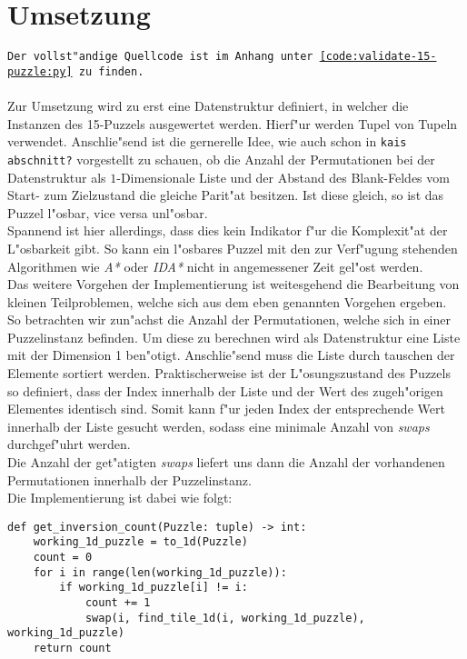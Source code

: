 \section{Umsetzung} %
\label{cha:Umsetzung}
\texttt{Der vollst"andige Quellcode ist im Anhang unter \ref{code:validate-15-puzzle:py} zu finden.}\\\\
Zur Umsetzung wird zu erst eine Datenstruktur definiert, in welcher die Instanzen des 15-Puzzels ausgewertet werden. Hierf"ur werden Tupel von Tupeln verwendet.
Anschlie"send ist die gernerelle Idee, wie auch schon in \texttt{kais abschnitt?} vorgestellt zu schauen, ob die Anzahl der Permutationen bei der Datenstruktur als $1$-Dimensionale Liste und der Abstand des Blank-Feldes vom Start- zum Zielzustand die gleiche Parit"at besitzen.
Ist diese gleich, so ist das Puzzel l"osbar, vice versa unl"osbar.\\
Spannend ist hier allerdings, dass dies kein Indikator f"ur die Komplexit"at der L"osbarkeit gibt. So kann ein l"osbares Puzzel mit den zur Verf"ugung stehenden Algorithmen wie \textit{A*} oder \textit{IDA*} nicht in angemessener Zeit gel"ost werden.\\
Das weitere Vorgehen der Implementierung ist weitesgehend die Bearbeitung von kleinen Teilproblemen, welche sich aus dem eben genannten Vorgehen ergeben.\\
So betrachten wir zun"achst die Anzahl der Permutationen, welche sich in einer Puzzelinstanz befinden. Um diese zu berechnen wird als Datenstruktur eine Liste mit der Dimension 1 ben"otigt.
Anschlie"send muss die Liste durch tauschen der Elemente sortiert werden.
Praktischerweise ist der L"osungszustand des Puzzels so definiert, dass der Index innerhalb der Liste und der Wert des zugeh"origen Elementes identisch sind. Somit kann f"ur jeden Index der entsprechende Wert innerhalb der Liste gesucht werden, sodass eine minimale Anzahl von \textit{swaps} durchgef"uhrt werden. \\Die Anzahl der get"atigten \textit{swaps} liefert uns dann die Anzahl der vorhandenen Permutationen innerhalb der Puzzelinstanz.\\
Die Implementierung ist dabei wie folgt:
\begin{verbatim}
def get_inversion_count(Puzzle: tuple) -> int:
    working_1d_puzzle = to_1d(Puzzle)
    count = 0
    for i in range(len(working_1d_puzzle)):
        if working_1d_puzzle[i] != i:
            count += 1
            swap(i, find_tile_1d(i, working_1d_puzzle), working_1d_puzzle)
    return count
\end{verbatim}

